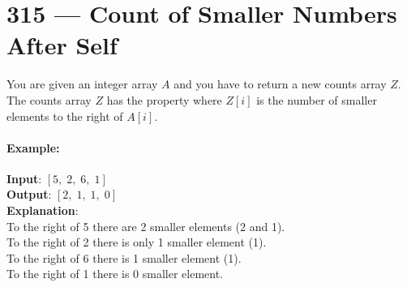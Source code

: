 \section{315 --- Count of Smaller Numbers After Self}
You are given an integer array $ A $ and you have to return a new counts array $ Z $. The counts array $ Z $ has the property where $ Z[i] $ is the number of smaller elements to the right of $ A[i] $.

\paragraph{Example:}

\begin{flushleft}
\textbf{Input}: $ [5,\;2,\;6,\;1] $
\\
\textbf{Output}: $ [2,\;1,\;1,\;0] $ 
\\
\textbf{Explanation}:
\\
To the right of 5 there are 2 smaller elements (2 and 1).
\\
To the right of 2 there is only 1 smaller element (1).
\\
To the right of 6 there is 1 smaller element (1).
\\
To the right of 1 there is 0 smaller element.
\end{flushleft}
